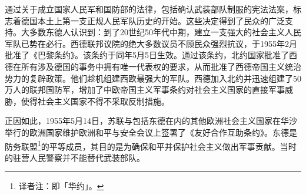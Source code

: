 通过关于成立国家人民军和国防部的法律，包括确认武装部队制服的宪法法案，标志着德国本土上第一支正规人民军队历史的开始。这些决定得到了民众的广泛支持。大多数东德人认识到：到了20世纪50年代中期，建立一支强大的社会主义人民军队已势在必行。西德联邦议院的绝大多数议员不顾民众强烈抗议，于1955年2月批准了《巴黎条约》。该条约于同年5月5日生效。通过该条约，北约国家批准了西德在所有涉及德国的事务中拥有唯一代表权的要求，从而批准了西德帝国主义统治势力的复辟政策。他们趁机组建西欧最强大的军队。西德加入北约并迅速组建了50万人的联邦国防军，增加了中欧帝国主义军事条约对社会主义国家的直接军事威胁，使得社会主义国家不得不采取反制措施。

正因如此，1955年5月14日，苏联与包括东德在内的其他欧洲社会主义国家在华沙举行的欧洲国家维护欧洲和平与安全会议上签署了《友好合作互助条约》。东德是防务联盟\footnote{译者注：即「华约」。}的平等成员，其目的是为确保和平并保护社会主义做出军事贡献。当时的驻营人民警察并不能替代武装部队。

